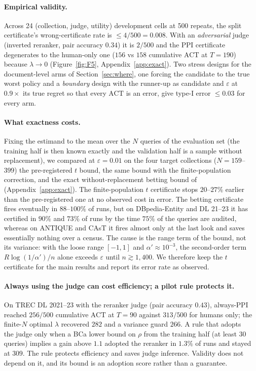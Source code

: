 \documentclass{article}
\newcommand{\eps}{\varepsilon}
\newcommand{\ACT}{\mathrm{ACT}}
\begin{document}
\paragraph{Empirical validity.} Across 24 (collection, judge, utility) development cells at 500 repeats, the split certificate's wrong-certificate rate is $\le 4/500=0.008$. With an \emph{adversarial} judge (inverted reranker, pair accuracy $0.34$) it is $2/500$ and the PPI certificate degenerates to the human-only one ($156$ vs $158$ cumulative $\ACT$ at $T=190$) because $\lambda\to0$ (Figure~\ref{fig:F5}, Appendix~\ref{app:exact}). Two stress designs for the document-level arms of Section~\ref{sec:where}, one forcing the candidate to the true worst policy and a \emph{boundary} design with the runner-up as candidate and $\eps$ at $0.9\times$ its true regret so that every $\ACT$ is an error, give type-I error $\le0.03$ for every arm.

\paragraph{What exactness costs.} Fixing the estimand to the mean over the $N$ queries of the evaluation set (the training half is then known exactly and the validation half is a sample without replacement), we compared at $\eps=0.01$ on the four target collections ($N=159$--$399$) the pre-registered $t$ bound, the same bound with the finite-population correction, and the exact without-replacement betting bound of \citet{waudby2020wor} (Appendix~\ref{app:exact}). The finite-population $t$ certificate stops $20$--$27\%$ earlier than the pre-registered one at no observed cost in error. The betting certificate fires eventually in $88$--$100\%$ of runs, but on DBpedia-Entity and DL 21--23 it has certified in $90\%$ and $73\%$ of runs by the time $75\%$ of the queries are audited, whereas on ANTIQUE and CAsT it fires almost only at the last look and saves essentially nothing over a census. The cause is the range term of the bound, not its variance: with the loose range $[-1,1]$ and $\alpha'\approx10^{-3}$, the second-order term $R\log(1/\alpha')/n$ alone exceeds $\eps$ until $n\gtrsim1{,}400$. We therefore keep the $t$ certificate for the main results and report its error rate as observed.

\paragraph{Always using the judge can cost efficiency; a pilot rule protects it.} On TREC DL 2021--23 with the reranker judge (pair accuracy $0.43$), always-PPI reached $256/500$ cumulative $\ACT$ at $T=90$ against $313/500$ for humans only; the finite-$N$ optimal $\lambda$ recovered $282$ and a variance guard $266$. A rule that adopts the judge only when a BCa lower bound on $\rho$ from the training half (at least 30 queries) implies a gain above $1.1$ adopted the reranker in $1.3\%$ of runs and stayed at $309$. The rule protects efficiency and saves judge inference. Validity does not depend on it, and its bound is an adoption score rather than a guarantee.
\end{document}
